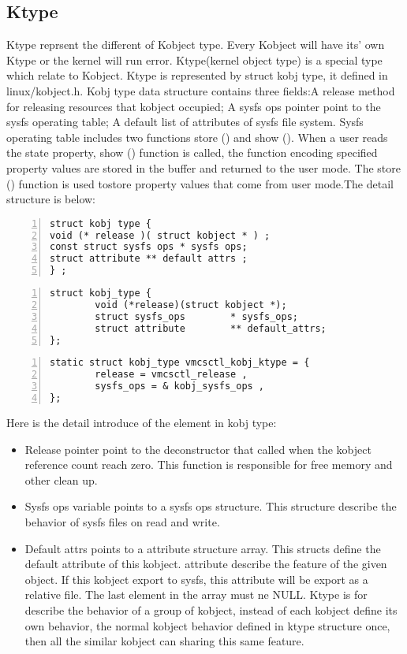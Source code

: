 \documentclass[10pt,draftclsnofoot,journal,compsoc,onecolumn]{IEEEtran}
\begin{document}
\subsection{Ktype}
Ktype reprsent the different of Kobject type. Every Kobject will have its' own Ktype or the kernel will run error. Ktype(kernel object type) is a special type which relate to Kobject. Ktype is represented by struct kobj type, it defined in linux/kobject.h. Kobj type data structure contains three fields:A release method for releasing resources that kobject occupied; A sysfs ops pointer point to the sysfs operating table; A default list of attributes of sysfs file system. Sysfs operating table includes two functions store () and show (). When a user reads the state property, show () function is called, the function encoding specified property values are stored in the buffer and returned to the user mode. The store () function is used tostore property values that come from user mode.The detail structure is below:

\begin{lstlisting}[numbers=left]
struct kobj type {
void (* release )( struct kobject * ) ;
const struct sysfs ops * sysfs ops;
struct attribute ** default attrs ;
} ;
\end{lstlisting}

\begin{lstlisting}[numbers=left]
struct kobj_type {
        void (*release)(struct kobject *);
        struct sysfs_ops        * sysfs_ops;
        struct attribute        ** default_attrs;
};
\end{lstlisting}

\begin{lstlisting}[numbers=left]
static struct kobj_type vmcsctl_kobj_ktype = {
		release = vmcsctl_release ,
		sysfs_ops = & kobj_sysfs_ops ,
};
\end{lstlisting}

Here is the detail introduce of the element in kobj type:
\begin{itemize}
\item Release pointer point to the deconstructor that called when the kobject reference count reach zero. This function is responsible for free memory and other clean up.
\item Sysfs ops variable points to a sysfs ops structure. This structure describe the behavior of sysfs files on read and write.
\item Default attrs points to a attribute structure array. This structs define the default attribute of this kobject. attribute describe the feature of the given object. If this kobject export to sysfs, this attribute will be export as a relative file. The last element in the array must ne NULL. Ktype is for describe the behavior of a group of kobject, instead of each kobject define its own behavior, the normal kobject behavior defined in ktype structure once, then all the similar kobject can sharing this same feature.
\end{itemize}
\end{document}

